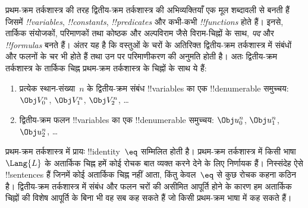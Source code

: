 \documentclass[../../../include/open-logic-section]{subfiles}
\begin{document}


प्रथम-क्रम तर्कशास्त्र की तरह द्वितीय-क्रम तर्कशास्त्र की अभिव्यक्तियाँ एक
मूल शब्दावली से बनती हैं जिसमें \emph{!!{variable}s},
\emph{!!{constant}s}, \emph{!!{predicate}s} और कभी-कभी
\emph{!!{function}s} होते हैं। इनसे, तार्किक संयोजकों, परिमाणकों तथा कोष्ठक
और अल्पविराम जैसे विराम-चिह्नों के साथ, \emph{पद} और \emph{!!{formula}s}
बनते हैं। अंतर यह है कि वस्तुओं के चरों के अतिरिक्त द्वितीय-क्रम तर्कशास्त्र
में संबंधों और फलनों के चर भी होते हैं तथा उन पर परिमाणीकरण की अनुमति होती
है। अतः द्वितीय-क्रम तर्कशास्त्र के तार्किक चिह्न प्रथम-क्रम तर्कशास्त्र के
चिह्नों के साथ ये हैं:

\begin{enumerate}
\item प्रत्येक स्थान-संख्या~$n$ के द्वितीय-क्रम संबंध !!{variable}s का एक
  !!{denumerable} समुच्चय: $\Obj V_0^n$, $\Obj V_1^n$, $\Obj V_2^n$, \dots
\item द्वितीय-क्रम फलन !!{variable}s का एक !!{denumerable} समुच्चय:
  $\Obj u_0^n$, $\Obj u_1^n$, $\Obj u_2^n$, \dots
\end{enumerate}

प्रथम-क्रम तर्कशास्त्र में प्रायः !!{identity}~$\eq$ सम्मिलित होती है।
प्रथम-क्रम तर्कशास्त्र में किसी भाषा~$\Lang{L}$ के अतार्किक चिह्न हमें कोई
रोचक बात व्यक्त करने देने के लिए निर्णायक हैं। निस्संदेह ऐसे !!{sentence}s
हैं जिनमें कोई अतार्किक चिह्न नहीं आता, किंतु केवल~$\eq$ से कुछ रोचक कहना
कठिन है। द्वितीय-क्रम तर्कशास्त्र में संबंध और फलन चरों की असीमित आपूर्ति होने
के कारण हम अतार्किक चिह्नों की विशेष आपूर्ति के बिना भी वह सब कह सकते हैं जो
किसी प्रथम-क्रम भाषा में कह सकते हैं।
\end{document}
